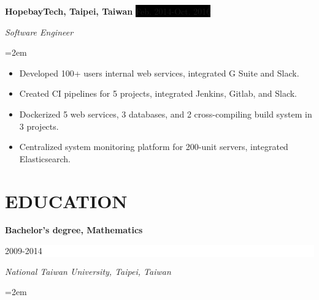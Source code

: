 \documentclass[a4paper, 11pt]{article}
\newcommand{\sepspace}{\vspace*{1em}}       %
\newcommand{\NewPart}[1]{\section*{\uppercase{#1}}}
\newcommand{\EducationEntry}[4]{
		\noindent \textbf{#1} \hfill      %
		\colorbox{White}{%
			\parbox{5cm}{%
			\hfill\color{Black}#2}} \par  %
		\noindent \textit{#3} \par        %
		\noindent\hangindent=2em\hangafter=0 \small #4 %
		\normalsize \par}
\newcommand{\WorkEntry}[4]{				  %
		\noindent \textbf{#1} \hfill      %
		\noindent\colorbox{Black}{\color{White}#2} \par  %
		\noindent \textit{#3} \par              %
		\noindent\hangindent=2em\hangafter=0 \small #4 %
		\normalsize \par}
\newcommand{\PrjEntry}[4]{				  %
		\noindent \textbf{#1} \hfill      %
		\noindent\colorbox{Black}{\color{White}#2} \par  %
		\noindent \textit{#3} \par              %
		\noindent\hangindent=2em\hangafter=0 \small #4 %
		\normalsize \par}
\begin{document}
\sepspace

\WorkEntry{HopebayTech, Taipei, Taiwan}{Feb. 2014-Oct. 2016}{Software Engineer}{
\begin{itemize}
	\item {Developed 100+ users internal web services, integrated G Suite and Slack.}
	\item {Created CI pipelines for 5 projects, integrated Jenkins, Gitlab, and Slack.}
	\item {Dockerized 5 web services, 3 databases, and 2 cross-compiling build system in 3 projects.}
	\item {Centralized system monitoring platform for 200-unit servers, integrated Elasticsearch.}
\end{itemize}
}

\NewPart{Education}{}

\EducationEntry{Bachelor's degree, Mathematics}{2009-2014}
{National Taiwan University, Taipei, Taiwan}{}


\end{document}
